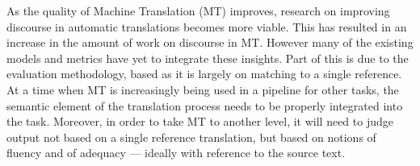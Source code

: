 As the quality of Machine Translation (MT) improves, research on improving discourse in automatic translations becomes more viable. This has resulted in an increase in the amount of work on discourse in MT. However many of the existing models and metrics have yet to integrate these insights. Part of this is due to the evaluation methodology, based as it is largely on matching to a single reference. At a time when MT is increasingly being used in a pipeline for other tasks, the semantic element of the translation process needs to be properly integrated into the task. Moreover, in order to take MT to another level, it will need to judge output not based on a single reference translation, but based on notions of fluency and of adequacy --- ideally with reference to the source text.
